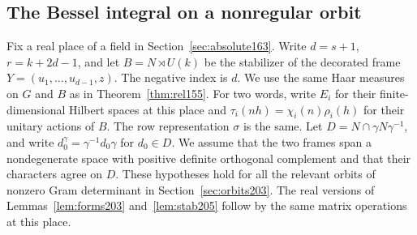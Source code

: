 \documentclass[a4paper,11pt]{article}
\theoremstyle{definition}
\theoremstyle{remark}
\numberwithin{equation}{section}
\begin{document}
\subsection{The Bessel integral on a nonregular orbit}\label{nav:IX-03}
\label{sec:quot207}

Fix a real place of a field in Section~\ref{sec:absolute163}. Write
\(d=s+1\), \(r=k+2d-1\), and let \(B=N\rtimes U(k)\) be the
stabilizer of the decorated frame \(Y=(u_1,\ldots,u_{d-1},z)\).
The negative index is \(d\). We use the same Haar measures on
\(G\) and \(B\) as in Theorem~\ref{thm:rel155}. For two words,
write \(E_i\) for their finite-dimensional Hilbert spaces at this
place and \(\tau_i(nh)=\chi_i(n)\rho_i(h)\) for their unitary
actions of \(B\). The row representation \(\sigma\) is the same.
Let \(D=N\cap\gamma N\gamma^{-1}\), and write
\(d_0^\gamma=\gamma^{-1}d_0\gamma\) for \(d_0\in D\).
We assume that the two frames span a nondegenerate space with
positive definite orthogonal complement and that their characters
agree on \(D\). These hypotheses hold for all the relevant orbits
of nonzero Gram determinant in Section~\ref{sec:orbits203}.
The real versions of Lemmas~\ref{lem:forms203} and~\ref{lem:stab205}
follow by the same matrix operations at this place.
\end{document}
